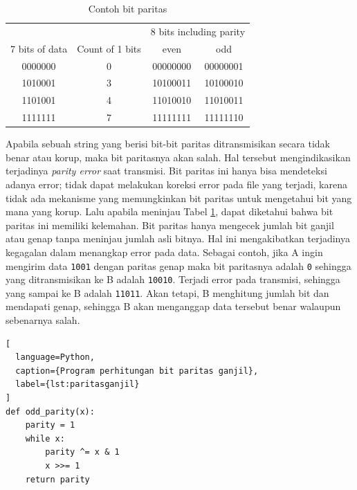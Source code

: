 \begin{table}
  \caption{Contoh bit paritas}
  \label{tab:parityexample}
  \centering
  \begin{tabular}{cccc}
    \toprule
    & & \multicolumn{2}{c}{8 bits including parity} \\
    7 bits of data & Count of 1 bits & even & odd \\
    \midrule
    0000000        & 0               & 00000000 & 00000001 \\
    1010001        & 3               & 10100011 & 10100010 \\
    1101001        & 4               & 11010010 & 11010011 \\
    1111111        & 7               & 11111111 & 11111110 \\
    \bottomrule
  \end{tabular}
\end{table}

Apabila sebuah string yang berisi bit-bit paritas ditransmisikan secara tidak benar atau korup, maka bit paritasnya akan salah. Hal tersebut mengindikasikan terjadinya \emph{parity error} saat transmisi. Bit paritas ini hanya bisa mendeteksi adanya error; tidak dapat melakukan koreksi error pada file yang terjadi, karena tidak ada mekanisme yang memungkinkan bit paritas untuk mengetahui bit yang mana yang korup. Lalu apabila meninjau Tabel \ref{tab:parityexample}, dapat diketahui bahwa bit paritas ini memiliki kelemahan. Bit paritas hanya mengecek jumlah bit ganjil atau genap tanpa meninjau jumlah asli bitnya. Hal ini mengakibatkan terjadinya kegagalan dalam menangkap error pada data. Sebagai contoh, jika A ingin mengirim data \verb|1001| dengan paritas genap maka bit paritasnya adalah \verb|0| sehingga yang ditransmisikan ke B adalah \verb|10010|. Terjadi error pada transmisi, sehingga yang sampai ke B adalah \verb|11011|. Akan tetapi, B menghitung jumlah bit dan mendapati genap, sehingga B akan menganggap data tersebut benar walaupun sebenarnya salah.



\begin{lstlisting}[
  language=Python,
  caption={Program perhitungan bit paritas ganjil},
  label={lst:paritasganjil}
]
def odd_parity(x):
    parity = 1
    while x:
        parity ^= x & 1
        x >>= 1
    return parity
\end{lstlisting}

